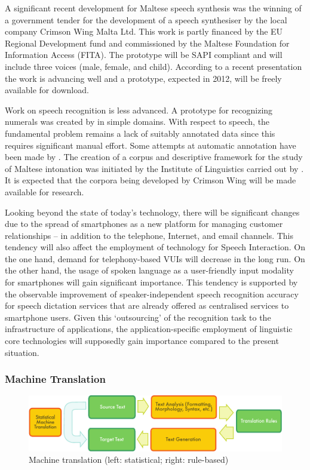 \begin{multicols}{2}
A significant recent development for Maltese speech synthesis was the winning of a government tender for the development of a speech synthesiser by the local company Crimson Wing Malta Ltd. This work is partly financed by the EU Regional Development fund and commissioned by the Maltese Foundation for Information Access (FITA). The prototype will be SAPI compliant and will include three voices (male, female, and child). According to a recent presentation \cite{Borg-et-al:2011} the work is advancing well and a prototype, expected in 2012, will be freely available for download. 

Work on speech recognition is less advanced. A prototype for recognizing numerals was created by \cite{Calleja:2002} in simple domains. With respect to speech, the fundamental problem remains a lack of suitably annotated data since this requires significant manual effort. Some attempts at automatic annotation have been made by \cite{Psaila:2008}. The creation of a corpus and descriptive framework for the study of Maltese intonation was initiated by the Institute of Linguistics carried out by \cite{Vella-Farrugia:2006}. It is expected that the corpora being developed by Crimson Wing will be made available for research.

Looking beyond the state of today’s technology, there will be significant changes due to the spread of smartphones as a new platform for managing customer relationships – in addition to the telephone, Internet, and email channels. This tendency will also affect the employment of technology for Speech Interaction. On the one hand, demand for telephony-based VUIs will decrease in the long run. On the other hand, the usage of spoken language as a user-friendly input modality for smartphones will gain significant importance. This tendency is supported by the observable improvement of speaker-independent speech recognition accuracy for speech dictation services that are already offered as centralised services to smartphone users. Given this ‘outsourcing’ of the recognition task to the infrastructure of applications, the application-specific employment of linguistic core technologies will supposedly gain importance compared to the present situation.

\subsubsection{Machine Translation}

\begin{figure}[htb]
  \center
  \includegraphics[width=\textwidth]{../_media/english/machine_translation}
  \caption{Machine translation (left: statistical; right: rule-based)}
\label{fig:mtarch_en}
\end{figure}


\end{multicols}
